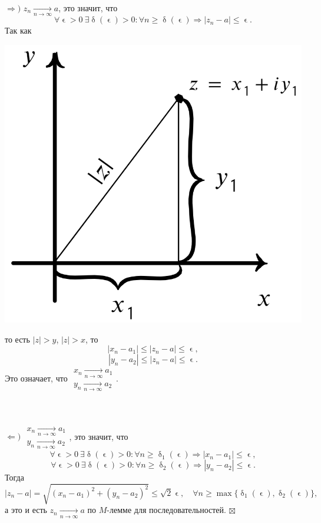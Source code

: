 \documentclass[a4paper, 12pt]{article}
\newenvironment{Proof} %
{\par\noindent{$\blacklozenge$}} %
{\hfill$\scriptstyle\boxtimes$}
\renewcommand{\delta}{\updelta}
\renewcommand{\epsilon}{\upvarepsilon}
\newcommand{\limdef}{\forall \epsilon >0\ \exists \delta (\epsilon) > 0}
\begin{document}
\begin{Proof}
	$\Rightarrow)$ $z_n \underset{n\to\infty}{\longrightarrow} a$, это значит, что $$\limdef : \forall n \geqslant \delta (\epsilon)\Rightarrow |z_n - a| \leqslant \epsilon.$$
	Так как\\
	\noindent
	\parbox[b][4.5cm][t]{10mm}{
		\includegraphics[scale=0.35]{images/015.png}}
	\hfill
	\parbox[b][4cm][t]{100mm}{	то есть $|z| > y$, $|z|>x$, то $$|x_n - a_1|\leqslant |z_n - a|\leqslant \epsilon,$$
		$$|y_n - a_2|\leqslant |z_n - a|\leqslant \epsilon.$$
		Это означает, что $\begin{matrix}
			x_n\underset{n\to\infty}{\longrightarrow}a_1\\
			y_n\underset{n\to\infty}{\longrightarrow}a_2
		\end{matrix}$.
		}\\\\
	$\Leftarrow)$ $\begin{matrix}
		x_n\underset{n\to\infty}{\longrightarrow}a_1\\
		y_n\underset{n\to\infty}{\longrightarrow}a_2
	\end{matrix}$, это значит, что $$\limdef : \forall n \geqslant \delta_1 (\epsilon)\Rightarrow |x_n - a_1| \leqslant \epsilon,$$
$$\limdef : \forall n \geqslant \delta_2 (\epsilon)\Rightarrow |y_n - a_2| \leqslant \epsilon.$$
Тогда $$|z_n - a| = \sqrt{(x_n - a_1)^2 + (y_n-a_2)^2}\leqslant \sqrt{2}\epsilon,\quad \forall n \geqslant \max\{\delta _1(\epsilon), \delta_2(\epsilon)\},$$
а это и есть $z_n \underset{n\to\infty}{\longrightarrow}a$ по $M$-лемме для последовательностей.
\end{Proof}\\\\
\end{document}
